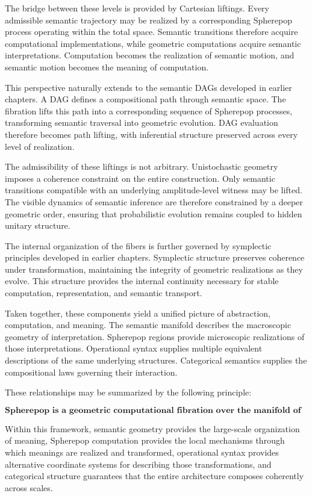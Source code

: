 \documentclass[12pt,letterpaper]{article}
\theoremstyle{remark}
\begin{document}
The bridge between these levels is provided by Cartesian liftings. Every admissible semantic trajectory may be realized by a corresponding Spherepop process operating within the total space. Semantic transitions therefore acquire computational implementations, while geometric computations acquire semantic interpretations. Computation becomes the realization of semantic motion, and semantic motion becomes the meaning of computation.

This perspective naturally extends to the semantic DAGs developed in earlier chapters. A DAG defines a compositional path through semantic space. The fibration lifts this path into a corresponding sequence of Spherepop processes, transforming semantic traversal into geometric evolution. DAG evaluation therefore becomes path lifting, with inferential structure preserved across every level of realization.

The admissibility of these liftings is not arbitrary. Unistochastic geometry imposes a coherence constraint on the entire construction. Only semantic transitions compatible with an underlying amplitude-level witness may be lifted. The visible dynamics of semantic inference are therefore constrained by a deeper geometric order, ensuring that probabilistic evolution remains coupled to hidden unitary structure.

The internal organization of the fibers is further governed by symplectic principles developed in earlier chapters. Symplectic structure preserves coherence under transformation, maintaining the integrity of geometric realizations as they evolve. This structure provides the internal continuity necessary for stable computation, representation, and semantic transport.

Taken together, these components yield a unified picture of abstraction, computation, and meaning. The semantic manifold describes the macroscopic geometry of interpretation. Spherepop regions provide microscopic realizations of those interpretations. Operational syntax supplies multiple equivalent descriptions of the same underlying structures. Categorical semantics supplies the compositional laws governing their interaction.

These relationships may be summarized by the following principle:

\[
\boxed{
\textbf{Spherepop is a geometric computational fibration over the manifold of meaning.}
}
\]

Within this framework, semantic geometry provides the large-scale organization of meaning, Spherepop computation provides the local mechanisms through which meanings are realized and transformed, operational syntax provides alternative coordinate systems for describing those transformations, and categorical structure guarantees that the entire architecture composes coherently across scales.
\end{document}
